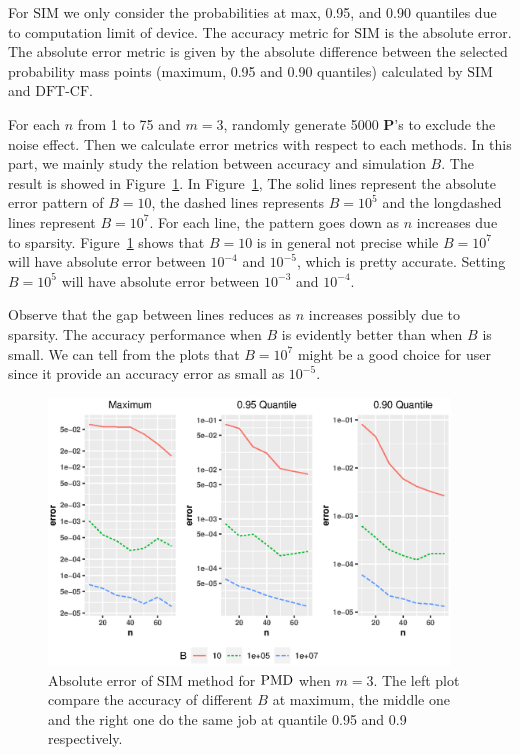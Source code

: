 \documentclass[12pt]{article}
\newcommand{\Pmat}{\mathbf{P}}
\newcommand{\PMD}{{\normalfont\textrm{PMD}}}
\newcommand{\SIM}{{\textrm{SIM}}}
\newcommand{\dft}{{\textrm{DFT-CF}}}
\begin{document}
For $\SIM$ we only consider the probabilities at max, 0.95, and 0.90 quantiles due to computation limit of device. The accuracy metric for $\SIM$ is the absolute error. The absolute error metric is given by the absolute difference between the selected probability mass points (maximum, 0.95 and 0.90 quantiles) calculated by $\SIM$ and $\dft$.

For each $n$ from 1 to 75 and $m=3$, randomly generate 5000 $\Pmat$'s to exclude the noise effect. Then we calculate error metrics with respect to each methods. In this part, we mainly study the relation between accuracy and simulation $B$. The result is showed in Figure~\ref{fig:accuracy.sim}. In Figure~\ref{fig:accuracy.sim}, The solid lines represent the absolute error pattern of $B=10$, the dashed lines represents $B=10^5$ and the longdashed lines represent $B=10^7$. For each line, the pattern goes down as $n$ increases due to sparsity. Figure~\ref{fig:accuracy.sim} shows that $B=10$ is in general not precise while $B=10^7$ will have absolute error between $10^{-4}$ and $10^{-5}$, which is pretty accurate. Setting $B=10^5$ will have absolute error between $10^{-3}$ and $10^{-4}$.

Observe that the gap between lines reduces as $n$ increases possibly due to sparsity. The accuracy performance when $B$ is evidently better than when $B$ is small. We can tell from the plots that $B=10^7$ might be a good choice for user since it provide an accuracy error as small as $10^{-5}$.

\begin{figure}%
\begin{center}
	\includegraphics[width=0.95\textwidth]{figures/sim.eps}
	\caption{Absolute error of $\SIM$ method for $\PMD$ when $m=3$. The left plot compare the accuracy of different $B$ at maximum, the middle one and the right one do the same job at quantile 0.95 and 0.9 respectively. }
	\label{fig:accuracy.sim}
\end{center}
\end{figure}
\end{document}
